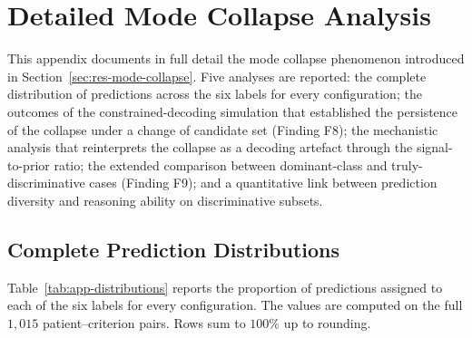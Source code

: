 
\chapter{Detailed Mode Collapse Analysis}
\label{app:mode-collapse}

This appendix documents in full detail the mode collapse phenomenon 
introduced in Section~\ref{sec:res-mode-collapse}. Five analyses are 
reported: the complete distribution of predictions across the six 
labels for every configuration; the outcomes of the constrained-decoding 
simulation that established the persistence of the collapse under a 
change of candidate set (Finding F8); the mechanistic analysis that 
reinterprets the collapse as a decoding artefact through the 
signal-to-prior ratio; the extended comparison between dominant-class 
and truly-discriminative cases (Finding F9); and a quantitative link 
between prediction diversity and reasoning ability on discriminative 
subsets.

\section{Complete Prediction Distributions}
\label{sec:app-distributions}

Table~\ref{tab:app-distributions} reports the proportion of predictions 
assigned to each of the six labels for every configuration. The values 
are computed on the full $1{,}015$ patient--criterion pairs. Rows sum to 
$100\%$ up to rounding.

